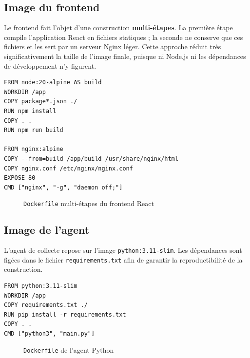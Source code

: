 \subsection{Image du frontend}
Le frontend fait l'objet d'une construction \textbf{multi-étapes}. La première étape
compile l'application React en fichiers statiques ; la seconde ne conserve que ces
fichiers et les sert par un serveur Nginx léger. Cette approche réduit très
significativement la taille de l'image finale, puisque ni Node.js ni les dépendances de
développement n'y figurent.

\begin{lrbox}{\codebox}
\begin{minipage}{0.88\textwidth}
\begin{verbatim}
FROM node:20-alpine AS build
WORKDIR /app
COPY package*.json ./
RUN npm install
COPY . .
RUN npm run build

FROM nginx:alpine
COPY --from=build /app/build /usr/share/nginx/html
COPY nginx.conf /etc/nginx/nginx.conf
EXPOSE 80
CMD ["nginx", "-g", "daemon off;"]
\end{verbatim}
\end{minipage}
\end{lrbox}
\begin{figure}[H]
\centering
\fbox{\usebox{\codebox}}
\caption{\texttt{Dockerfile} multi-étapes du frontend React}
\label{fig:dockerfile-front}
\end{figure}

\subsection{Image de l'agent}
L'agent de collecte repose sur l'image \texttt{python:3.11-slim}. Les dépendances sont
figées dans le fichier \texttt{requirements.txt} afin de garantir la reproductibilité de
la construction.

\begin{lrbox}{\codebox}
\begin{minipage}{0.88\textwidth}
\begin{verbatim}
FROM python:3.11-slim
WORKDIR /app
COPY requirements.txt ./
RUN pip install -r requirements.txt
COPY . .
CMD ["python3", "main.py"]
\end{verbatim}
\end{minipage}
\end{lrbox}
\begin{figure}[H]
\centering
\fbox{\usebox{\codebox}}
\caption{\texttt{Dockerfile} de l'agent Python}
\label{fig:dockerfile-agent}
\end{figure}

